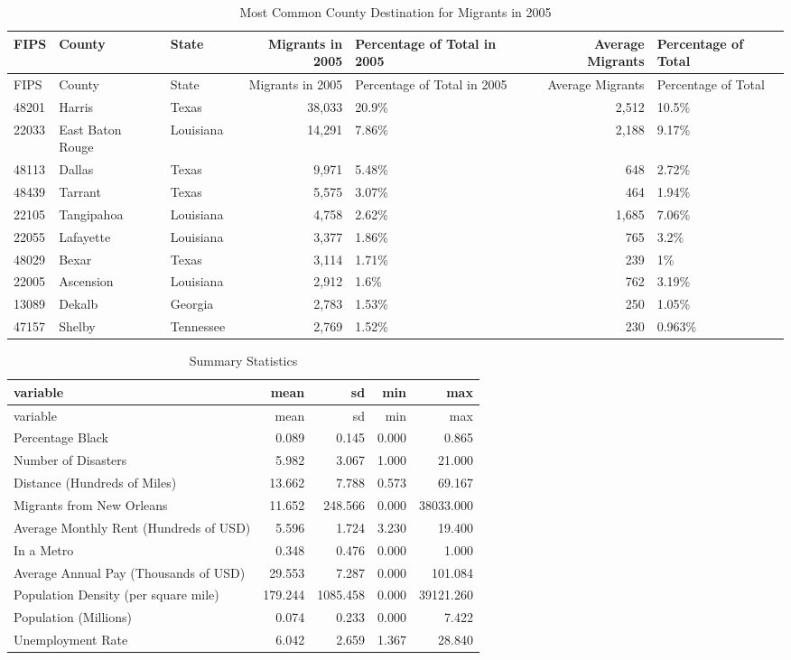 \documentclass[]{article}
\begin{document}
\clearpage

\begin{longtable}[]{@{}lllrlrl@{}}
\caption{Most Common County Destination for Migrants in 2005
\label{tab:commondest}}\tabularnewline
\toprule
FIPS & County & State & Migrants in 2005 & Percentage of Total in 2005 &
Average Migrants & Percentage of Total\tabularnewline
\midrule
\endfirsthead
\toprule
FIPS & County & State & Migrants in 2005 & Percentage of Total in 2005 &
Average Migrants & Percentage of Total\tabularnewline
\midrule
\endhead
48201 & Harris & Texas & 38,033 & 20.9\% & 2,512 & 10.5\%\tabularnewline
22033 & East Baton Rouge & Louisiana & 14,291 & 7.86\% & 2,188 &
9.17\%\tabularnewline
48113 & Dallas & Texas & 9,971 & 5.48\% & 648 & 2.72\%\tabularnewline
48439 & Tarrant & Texas & 5,575 & 3.07\% & 464 & 1.94\%\tabularnewline
22105 & Tangipahoa & Louisiana & 4,758 & 2.62\% & 1,685 &
7.06\%\tabularnewline
22055 & Lafayette & Louisiana & 3,377 & 1.86\% & 765 &
3.2\%\tabularnewline
48029 & Bexar & Texas & 3,114 & 1.71\% & 239 & 1\%\tabularnewline
22005 & Ascension & Louisiana & 2,912 & 1.6\% & 762 &
3.19\%\tabularnewline
13089 & Dekalb & Georgia & 2,783 & 1.53\% & 250 & 1.05\%\tabularnewline
47157 & Shelby & Tennessee & 2,769 & 1.52\% & 230 &
0.963\%\tabularnewline
\bottomrule
\end{longtable}

\clearpage

\begin{longtable}[]{@{}lrrrr@{}}
\caption{Summary Statistics \label{tab:sumstats}}\tabularnewline
\toprule
variable & mean & sd & min & max\tabularnewline
\midrule
\endfirsthead
\toprule
variable & mean & sd & min & max\tabularnewline
\midrule
\endhead
Percentage Black & 0.089 & 0.145 & 0.000 & 0.865\tabularnewline
Number of Disasters & 5.982 & 3.067 & 1.000 & 21.000\tabularnewline
Distance (Hundreds of Miles) & 13.662 & 7.788 & 0.573 &
69.167\tabularnewline
Migrants from New Orleans & 11.652 & 248.566 & 0.000 &
38033.000\tabularnewline
Average Monthly Rent (Hundreds of USD) & 5.596 & 1.724 & 3.230 &
19.400\tabularnewline
In a Metro & 0.348 & 0.476 & 0.000 & 1.000\tabularnewline
Average Annual Pay (Thousands of USD) & 29.553 & 7.287 & 0.000 &
101.084\tabularnewline
Population Density (per square mile) & 179.244 & 1085.458 & 0.000 &
39121.260\tabularnewline
Population (Millions) & 0.074 & 0.233 & 0.000 & 7.422\tabularnewline
Unemployment Rate & 6.042 & 2.659 & 1.367 & 28.840\tabularnewline
\bottomrule
\end{longtable}
\end{document}
